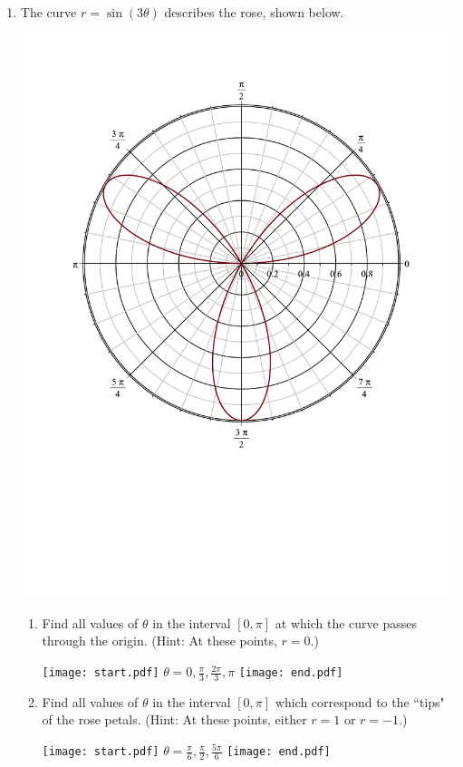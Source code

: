 \documentclass[12pt]{article}
\begin{document}
\begin{enumerate}
\item The curve $r=\sin{(3\theta)}$ describes the rose, shown below.
\begin{center}
\includegraphics[scale=0.3]{rose.pdf}
\end{center}

\begin{enumerate}

\item Find all values of $\theta$ in the interval $[0,\pi]$ at which the curve passes through the origin.  (Hint: At these points, $r=0$.)

\texttt{[image: start.pdf]}
{$\theta=0, \frac{\pi}{3}, \frac{2\pi}{3}, \pi$}
\texttt{[image: end.pdf]}


\item Find all values of $\theta$ in the interval $[0,\pi]$ which correspond to the ``tips" of the rose petals.  (Hint: At these points, either $r=1$ or $r=-1$.)

\texttt{[image: start.pdf]}
{$\theta=\frac{\pi}{6}, \frac{\pi}{2}, \frac{5\pi}{6}$}
\texttt{[image: end.pdf]}


\end{enumerate}


\end{enumerate}
\end{document}
